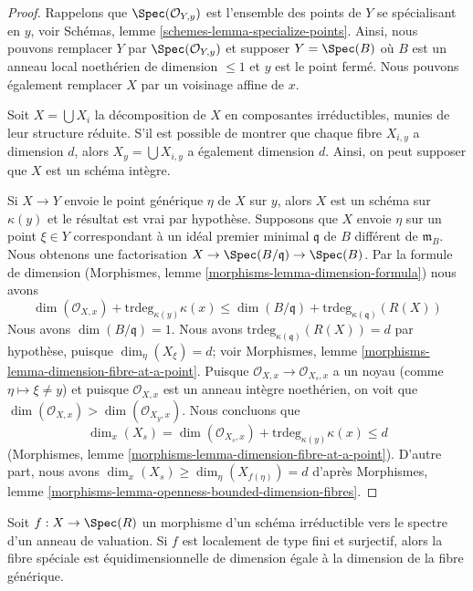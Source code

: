 \begin{proof}
Rappelons que $\Spec(\mathcal{O}_{Y, y})$ est l'ensemble
des points de $Y$ se spécialisant en $y$, voir Schémas,
lemme \ref{schemes-lemma-specialize-points}. Ainsi, nous
pouvons remplacer $Y$ par $\Spec(\mathcal{O}_{Y, y})$ et
supposer $Y = \Spec(B)$ où $B$ est un anneau local
noethérien de dimension $\leq 1$ et $y$ est le point fermé. Nous
pouvons également remplacer $X$ par un voisinage affine de $x$.

\medskip\noindent
Soit $X = \bigcup X_i$ la décomposition de $X$ en composantes irréductibles,
munies de leur structure réduite. S'il est possible de montrer que
chaque fibre $X_{i, y}$ a dimension $d$, alors $X_y = \bigcup X_{i, y}$ a
également dimension $d$. Ainsi, on peut supposer que $X$ est un schéma intègre.

\medskip\noindent
Si $X \to Y$ envoie le point générique $\eta$ de $X$ sur
$y$, alors $X$ est un schéma sur $\kappa(y)$ et le
résultat est vrai par hypothèse. Supposons que $X$ envoie
$\eta$ sur un point $\xi \in Y$ correspondant à un idéal
premier minimal $\mathfrak q$ de $B$ différent de $\mathfrak
m_B$. Nous obtenons une factorisation $X \to
\Spec(B/\mathfrak q) \to \Spec(B)$. Par la formule de dimension
(Morphismes, lemme \ref{morphisms-lemma-dimension-formula}) nous avons
$$
\dim(\mathcal{O}_{X, x}) + \text{trdeg}_{\kappa(y)} \kappa(x) \leq
\dim(B/\mathfrak q) + \text{trdeg}_{\kappa(\mathfrak q)}(R(X))
$$
Nous avons $\dim(B/\mathfrak q) = 1$. Nous avons
$\text{trdeg}_{\kappa(\mathfrak q)}(R(X)) = d$ par
hypothèse, puisque $\dim_\eta(X_\xi) = d$; voir
Morphismes, lemme
\ref{morphisms-lemma-dimension-fibre-at-a-point}. Puisque
$\mathcal{O}_{X, x} \to \mathcal{O}_{X_s, x}$ a un noyau
(comme $\eta \mapsto \xi \not = y$) et puisque
$\mathcal{O}_{X, x}$ est un anneau intègre noethérien, on voit que
$\dim(\mathcal{O}_{X, x}) > \dim(\mathcal{O}_{X_y, x})$. Nous concluons que
$$
\dim_x(X_s) =
\dim(\mathcal{O}_{X_s, x}) + \text{trdeg}_{\kappa(y)} \kappa(x) \leq d
$$
(Morphismes, lemme
\ref{morphisms-lemma-dimension-fibre-at-a-point}). D'autre part,
nous avons $\dim_x(X_s) \geq \dim_\eta(X_{f(\eta)}) = d$ d'après
Morphismes, lemme \ref{morphisms-lemma-openness-bounded-dimension-fibres}.
\end{proof}

\begin{lemma}
\label{lemma-dominate-valuation-ring-dimension-fibres}
Soit $f : X \to \Spec(R)$ un morphisme d'un schéma
irréductible vers le spectre d'un anneau de valuation. Si $f$ est
localement de type fini et surjectif, alors la fibre spéciale est
équidimensionnelle de dimension égale à la dimension de la fibre générique.
\end{lemma}

